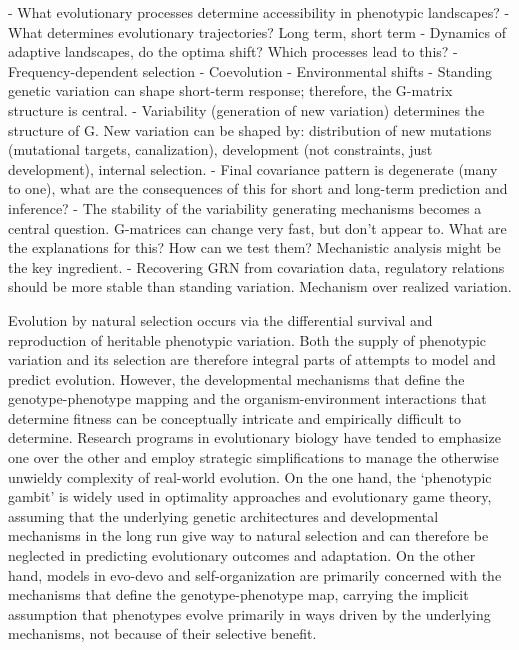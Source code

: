 
- What evolutionary processes determine accessibility in phenotypic landscapes? - What determines evolutionary trajectories?
Long term, short term - Dynamics of adaptive landscapes, do the optima shift?
Which processes lead to this? - Frequency-dependent selection - Coevolution - Environmental shifts - Standing genetic variation can shape short-term response; therefore, the G-matrix structure is central. - Variability (generation of new variation) determines the structure of G.
New variation can be shaped by: distribution of new mutations (mutational targets, canalization), development (not constraints, just development), internal selection. - Final covariance pattern is degenerate (many to one), what are the consequences of this for short and long-term prediction and inference? - The stability of the variability generating mechanisms becomes a central question.
G-matrices can change very fast, but don't appear to.
What are the explanations for this?
How can we test them?
Mechanistic analysis might be the key ingredient. - Recovering GRN from covariation data, regulatory relations should be more stable than standing variation.
Mechanism over realized variation.


Evolution by natural selection occurs via the differential survival and reproduction of heritable phenotypic variation.
Both the supply of phenotypic variation and its selection are therefore integral parts of attempts to model and predict evolution.
However, the developmental mechanisms that define the genotype-phenotype mapping and the organism-environment interactions that determine fitness can be conceptually intricate and empirically difficult to determine.
Research programs in evolutionary biology have tended to emphasize one over the other and employ strategic simplifications to manage the otherwise unwieldy complexity of real-world evolution.
On the one hand, the ‘phenotypic gambit’ is widely used in optimality approaches and evolutionary game theory, assuming that the underlying genetic architectures and developmental mechanisms in the long run give way to natural selection and can therefore be neglected in predicting evolutionary outcomes and adaptation.
On the other hand, models in evo-devo and self-organization are primarily concerned with the mechanisms that define the genotype-phenotype map, carrying the implicit assumption that phenotypes evolve primarily in ways driven by the underlying mechanisms, not because of their selective benefit.

